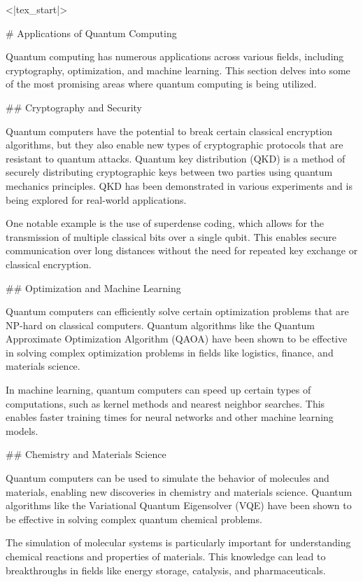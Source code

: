 <|tex_start|>

# Applications of Quantum Computing

Quantum computing has numerous applications across various fields, including cryptography, optimization, and machine learning. This section delves into some of the most promising areas where quantum computing is being utilized.

## Cryptography and Security

Quantum computers have the potential to break certain classical encryption algorithms, but they also enable new types of cryptographic protocols that are resistant to quantum attacks. Quantum key distribution (QKD) is a method of securely distributing cryptographic keys between two parties using quantum mechanics principles. QKD has been demonstrated in various experiments and is being explored for real-world applications.

One notable example is the use of superdense coding, which allows for the transmission of multiple classical bits over a single qubit. This enables secure communication over long distances without the need for repeated key exchange or classical encryption.

## Optimization and Machine Learning

Quantum computers can efficiently solve certain optimization problems that are NP-hard on classical computers. Quantum algorithms like the Quantum Approximate Optimization Algorithm (QAOA) have been shown to be effective in solving complex optimization problems in fields like logistics, finance, and materials science.

In machine learning, quantum computers can speed up certain types of computations, such as kernel methods and nearest neighbor searches. This enables faster training times for neural networks and other machine learning models.

## Chemistry and Materials Science

Quantum computers can be used to simulate the behavior of molecules and materials, enabling new discoveries in chemistry and materials science. Quantum algorithms like the Variational Quantum Eigensolver (VQE) have been shown to be effective in solving complex quantum chemical problems.

The simulation of molecular systems is particularly important for understanding chemical reactions and properties of materials. This knowledge can lead to breakthroughs in fields like energy storage, catalysis, and pharmaceuticals.


